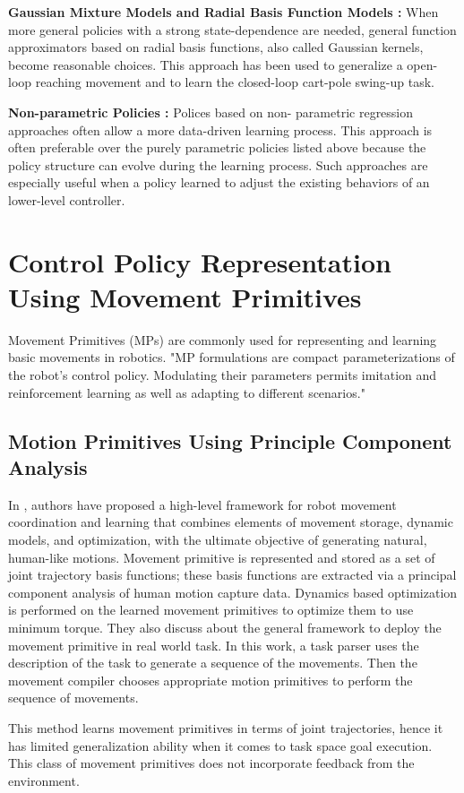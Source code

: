\textbf{Gaussian Mixture Models and Radial Basis Function Models :} When more general policies with a strong state-dependence are needed, general function approximators based on radial basis functions, also called Gaussian kernels, become reasonable choices.
This approach has been used to generalize a open-loop reaching movement and to learn the closed-loop cart-pole swing-up task.

\textbf{Non-parametric Policies :} Polices based on non- parametric regression approaches often allow a more data-driven learning process. This approach is often preferable over the purely parametric policies listed above because the policy structure can evolve during the learning process. Such approaches are especially useful when a policy learned to adjust the existing behaviors of an lower-level controller. 


\section{Control Policy Representation Using Movement Primitives}
Movement Primitives (MPs) are commonly used for representing and learning basic movements in robotics. "MP formulations are compact parameterizations of the robot’s control policy. Modulating their parameters permits imitation and reinforcement learning as well as adapting to different scenarios." \cite{paraschos2013probabilistic}

\subsection{Motion Primitives Using Principle Component Analysis}
In \cite{lim2005movement}, authors have proposed a high-level framework for robot movement coordination and learning that combines elements of movement storage, dynamic models, and optimization, with the ultimate objective of generating natural, human-like motions. Movement primitive is represented and stored as a set of joint trajectory basis functions; these basis functions are extracted via a principal component analysis of human motion capture data. Dynamics based optimization is performed on the learned movement primitives to optimize them to use minimum torque. They also discuss about the general framework to deploy the movement primitive in real world task. In this work, a task parser uses the description of the task to generate a sequence of the movements. Then the movement compiler chooses appropriate motion primitives to perform the sequence of movements. 
\par This method learns movement primitives in terms of joint trajectories, hence it has limited generalization ability when it comes to task space goal execution. This class of movement primitives does not incorporate feedback from the environment.   

